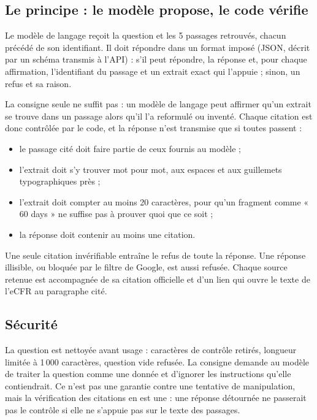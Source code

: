 \documentclass[11pt,a4paper]{article}
\begin{document}
\subsection{Le principe : le modèle propose, le code vérifie}

Le modèle de langage reçoit la question et les 5 passages retrouvés, chacun précédé de son identifiant. Il doit répondre dans un format imposé (JSON, décrit par un schéma transmis à l'API) : s'il peut répondre, la réponse et, pour chaque affirmation, l'identifiant du passage et un extrait exact qui l'appuie ; sinon, un refus et sa raison.

La consigne seule ne suffit pas : un modèle de langage peut affirmer qu'un extrait se trouve dans un passage alors qu'il l'a reformulé ou inventé. Chaque citation est donc contrôlée par le code, et la réponse n'est transmise que si toutes passent :
\begin{itemize}
  \item le passage cité doit faire partie de ceux fournis au modèle ;
  \item l'extrait doit s'y trouver mot pour mot, aux espaces et aux guillemets typographiques près ;
  \item l'extrait doit compter au moins 20 caractères, pour qu'un fragment comme « 60 days » ne suffise pas à prouver quoi que ce soit ;
  \item la réponse doit contenir au moins une citation.
\end{itemize}

Une seule citation invérifiable entraîne le refus de toute la réponse. Une réponse illisible, ou bloquée par le filtre de Google, est aussi refusée. Chaque source retenue est accompagnée de sa citation officielle et d'un lien qui ouvre le texte de l'eCFR au paragraphe cité.

\subsection{Sécurité}

La question est nettoyée avant usage : caractères de contrôle retirés, longueur limitée à 1\,000 caractères, question vide refusée. La consigne demande au modèle de traiter la question comme une donnée et d'ignorer les instructions qu'elle contiendrait. Ce n'est pas une garantie contre une tentative de manipulation, mais la vérification des citations en est une : une réponse détournée ne passerait pas le contrôle si elle ne s'appuie pas sur le texte des passages.
\end{document}
